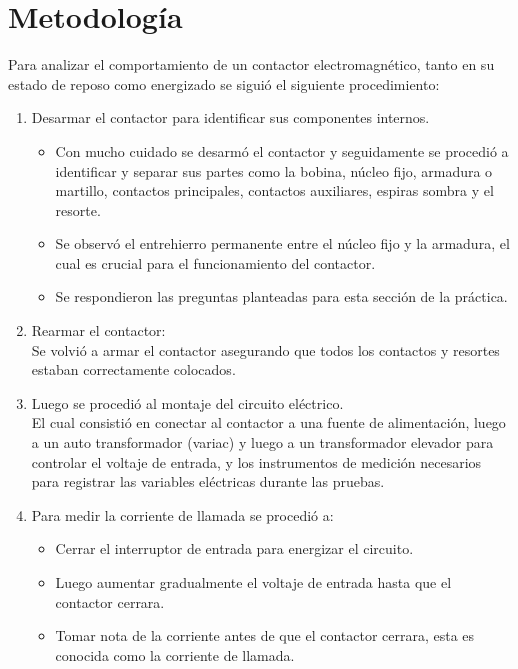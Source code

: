 \section{Metodología}

Para analizar el comportamiento de un contactor electromagnético, tanto en su estado de reposo como energizado se siguió el siguiente procedimiento:

\begin{enumerate}
    \item Desarmar el contactor para identificar sus componentes internos.
    \begin{itemize}
        \item Con mucho cuidado se desarmó el contactor y seguidamente se procedió a identificar y separar sus partes como la bobina, núcleo fijo, armadura o martillo, contactos principales, contactos auxiliares, espiras sombra y el resorte.
        \item Se observó el entrehierro permanente entre el núcleo fijo y la armadura, el cual es crucial para el funcionamiento del contactor.
        \item Se respondieron las preguntas planteadas para esta sección de la práctica.
    \end{itemize}
    
    \item Rearmar el contactor:\\ 
    Se volvió a armar el contactor asegurando que todos los contactos y resortes estaban correctamente colocados.
    
    \item Luego se procedió al montaje del circuito eléctrico.\\
    El cual consistió en conectar al contactor a una fuente de alimentación, luego a un auto transformador (variac) y luego a un transformador elevador para controlar el voltaje de entrada, y los instrumentos de medición necesarios para registrar las variables eléctricas durante las pruebas.
    
    \item Para medir la corriente de llamada se procedió a:
    \begin{itemize}
        \item Cerrar el interruptor de entrada para energizar el circuito.
        \item Luego aumentar gradualmente el voltaje de entrada hasta que el contactor cerrara.
        \item Tomar nota de la corriente antes de que el contactor cerrara, esta es conocida como la corriente de llamada.
    \end{itemize}


\end{enumerate}
